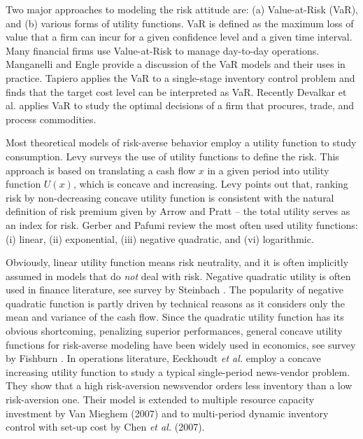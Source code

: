 \documentclass[mnsc,nonblindrev,copyedit]{informs2_wz} %
\begin{document}
Two major approaches to modeling the risk attitude are: (a) Value-at-Risk (VaR), and (b) various forms of utility functions.  VaR is defined as the maximum loss of value that a firm can incur for a given confidence level and a given time interval.  Many financial firms use Value-at-Risk to manage day-to-day operations.  Manganelli and Engle \cite{Manganelli2001} provide a discussion of the VaR models and their uses in practice. Tapiero \cite{tapiero_value_2005} applies the VaR to a single-stage inventory control problem and finds that the target cost level can be interpreted as VaR.  Recently Devalkar et al. \cite{devalkar_integrated_2010} applies VaR to study the optimal decisions of a firm that procures, trade, and process commodities. %


\medskip

Most theoretical models of risk-averse behavior employ a utility function to study consumption.  Levy \cite{Levy92} surveys the use of utility functions to define the risk.  This approach is based on translating a cash flow $x$ in a given period into utility function $U(x)$, which is concave and increasing.  Levy points out that, ranking risk by non-decreasing concave utility function is consistent with the natural definition of risk premium given by Arrow \cite{Arrow1951} and Pratt \cite{Pratt1964} -- the total utility serves as an index for risk.  Gerber and Pafumi \cite{Gerber1998} review the most often used utility functions: (i) linear, (ii) exponential, (iii) negative quadratic, and (vi) logarithmic.

Obviously, linear utility function means risk neutrality, and it is often implicitly assumed in models that do \emph{not} deal with risk.  Negative quadratic utility is often used in finance literature, see survey by Steinbach \cite{Steinbach2001}.  The popularity of negative quadratic function is partly driven by technical reasons as it considers only the mean and variance of the cash flow. 
Since the quadratic utility function has its obvious shortcoming, penalizing superior performances,  general concave utility functions for risk-averse modeling have been widely used in economics, see survey by Fishburn \cite{Fishburn1989}. In operations literature,  Eeckhoudt {\it et al.} \cite{Eeckhoudt1995} employ a concave increasing utility function to study a typical single-period  news-vendor problem.  They show that a high risk-aversion newsvendor orders less inventory than a low risk-aversion one. Their model is extended to multiple resource capacity investment by Van Mieghem (2007) and to multi-period dynamic inventory control with set-up cost by Chen {\it et al.} (2007).
\end{document}
